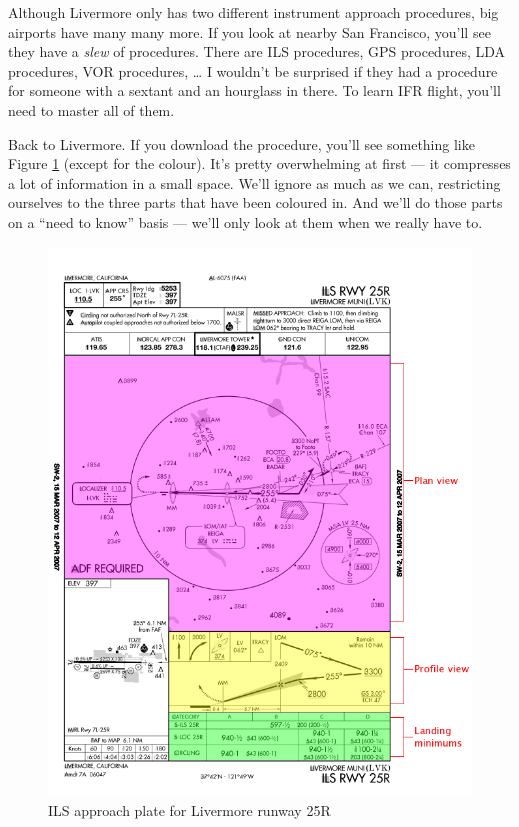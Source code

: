 Although Livermore only has two different instrument approach
procedures, big airports have many many more.  If you look at nearby
San Francisco, you'll see they have a \emph{slew} of procedures.
There are ILS procedures, GPS procedures, LDA procedures, VOR
procedures, \ldots{} I wouldn't be surprised if they had a procedure
for someone with a sextant and an hourglass in there.  To learn IFR
flight, you'll need to master all of them.

Back to Livermore.  If you download the procedure, you'll see
something like Figure \ref{fig:big_plate} (except for the colour).
It's pretty overwhelming at first --- it compresses a lot of
information in a small space.  We'll ignore as much as we can,
restricting ourselves to the three parts that have been coloured in.
And we'll do those parts on a ``need to know'' basis --- we'll only
look at them when we really have to.

\begin{figure}
  \begin{center}
    \includegraphics[width=14cm]{img/big_plate.png}
    \caption{ILS approach plate for Livermore runway 25R}
    \label{fig:big_plate}
  \end{center}
\end{figure}

